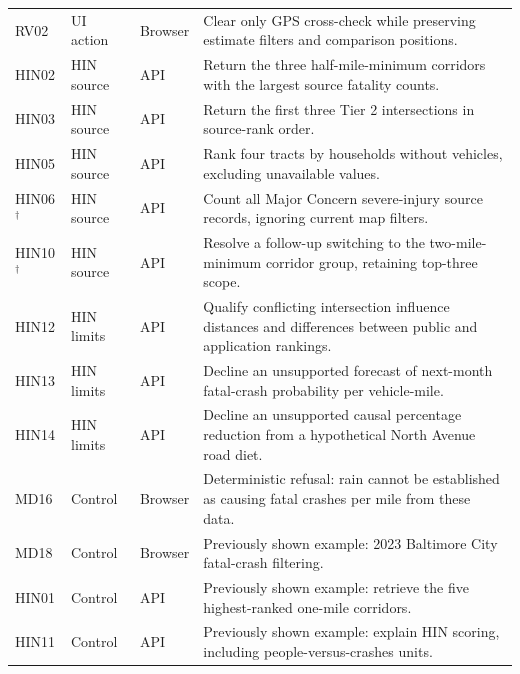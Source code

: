 \begin{longtable}{@{}p{}p{}p{}p{}@{}}
RV02 & UI action & Browser & Clear only GPS cross-check while preserving estimate filters and comparison positions.\\
HIN02 & HIN source & API & Return the three half-mile-minimum corridors with the largest source fatality counts.\\
HIN03 & HIN source & API & Return the first three Tier 2 intersections in source-rank order.\\
HIN05 & HIN source & API & Rank four tracts by households without vehicles, excluding unavailable values.\\
HIN06$^{\dagger}$ & HIN source & API & Count all Major Concern severe-injury source records, ignoring current map filters.\\
HIN10$^{\dagger}$ & HIN source & API & Resolve a follow-up switching to the two-mile-minimum corridor group, retaining top-three scope.\\
HIN12 & HIN limits & API & Qualify conflicting intersection influence distances and differences between public and application rankings.\\
HIN13 & HIN limits & API & Decline an unsupported forecast of next-month fatal-crash probability per vehicle-mile.\\
HIN14 & HIN limits & API & Decline an unsupported causal percentage reduction from a hypothetical North Avenue road diet.\\
\midrule
MD16 & Control & Browser & Deterministic refusal: rain cannot be established as causing fatal crashes per mile from these data.\\
MD18 & Control & Browser & Previously shown example: 2023 Baltimore City fatal-crash filtering.\\
HIN01 & Control & API & Previously shown example: retrieve the five highest-ranked one-mile corridors.\\
HIN11 & Control & API & Previously shown example: explain HIN scoring, including people-versus-crashes units.\\
\bottomrule
\end{longtable}
